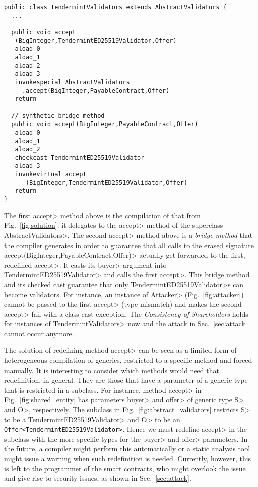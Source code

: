 \begin{lstlisting}[language=JavaBytecode]
public class TendermintValidators extends AbstractValidators {
  ...
  
  public void accept
   (BigInteger,TendermintED25519Validator,Offer)
   aload_0
   aload_1
   aload_2
   aload_3
   invokespecial AbstractValidators
     .accept(BigInteger,PayableContract,Offer)
   return

  // synthetic bridge method
  public void accept(BigInteger,PayableContract,Offer)
   aload_0
   aload_1
   aload_2
   checkcast TendermintED25519Validator
   aload_3
   invokevirtual accept
      (BigInteger,TendermintED25519Validator,Offer)
   return
}
\end{lstlisting}

\noindent
The first \<accept> method above is the compilation of that from Fig.~\ref{fig:solution}:
it delegates to the \<accept> method of the superclass \<AbstractValidators>. The second
\<accept> method above is a \emph{bridge method} that the compiler generates in order to guarantee
that all calls to the erased signature \<accept(BigInteger,PayableContract,Offer)> actually
get forwarded to the first, redefined \<accept>. It casts its \<buyer> argument
into \<TendermintED25519Validator> and calls the first \<accept>. This
bridge method and its checked cast guarantee that only \<TendermintED25519Validator>s
can become validators. For instance, an instance of \<Attacker> (Fig.~\ref{fig:attacker})
cannot be passed to the first \<accept> (type mismatch) and makes the second \<accept>
fail with a class cast exception. The \emph{Consistency of Shareholders} holds
for instances of \<TendermintValidators> now and the attack in Sec.~\ref{sec:attack} cannot occur
anymore.

The solution of redefining method \<accept> can be seen as a limited form of heterogeneous
compilation of generics, restricted to a specific method and forced manually.
It is interesting to consider which methods
would need that redefinition, in general. They are those that have a parameter of a generic type
that is restricted in a subclass. For instance, method \<accept> in
Fig.~\ref{fig:shared_entity} has parameters \<buyer> and \<offer> of generic type
\<S> and \<O>, respectively. The subclass in Fig.~\ref{fig:abstract_validators} restricts
\<S> to be a \<TendermintED25519Validator> and \<O> to be
an {\codesize\texttt{Offer<TendermintED25519Validator>}}. Hence we must redefine
\<accept> in the subclass with the more specific types for the \<buyer> and \<offer>
parameters. In the future, a compiler might perform this automatically or a static analysis
tool might issue a warning when such redefinition is needed. Currently, however, this is
left to the programmer of the smart contracts, who might overlook the issue
and give rise to security issues, as shown in Sec.~\ref{sec:attack}.

